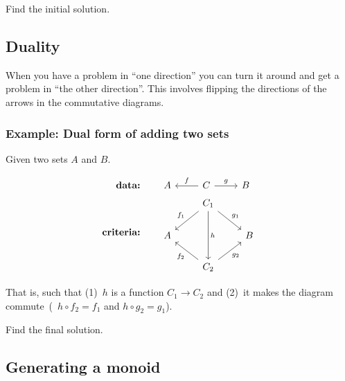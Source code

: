 \begin{exercise}
    Find the initial solution. \label{ex:addsets}
\end{exercise}

\subsection{Duality}

When you have a problem in ``one direction'' you can turn it around and get a
problem in ``the other direction''. This involves flipping the directions of
the arrows in the commutative diagrams.

\subsubsection*{Example: Dual form of adding two sets}

Given two sets $A$ and $B$.

\begin{align*}
     \textbf{data:}\qquad & \begin{tikzcd}[ampersand replacement=\&]
            A \& C \arrow[l, swap, "f"] \arrow[r, "g"] \& B
        \end{tikzcd} \\
    \textbf{criteria:}\qquad & \begin{tikzcd}[ampersand replacement=\&]
          {} \& C_1 \arrow[dd, "h"] \arrow[ld, swap, "f_1"] \arrow[rd, "g_1"]
          \& {} \\ A \& {} \& B \\
          {} \& C_2 \arrow[lu, "f_2"] \arrow[ru, swap, "g_2"] \& {}
      \end{tikzcd}
\end{align*}



That is, such that (1)~$h$ is a function $C_1 \rightarrow C_2$ and (2)~it
makes the diagram commute~(\ie~$h \circ f_2 = f_1$ and $h \circ g_2 = g_1$).

\begin{exercise}
    Find the final solution. \label{ex:dual}
\end{exercise}


\subsection{Generating a monoid}
\label{section_generate_monoid}

